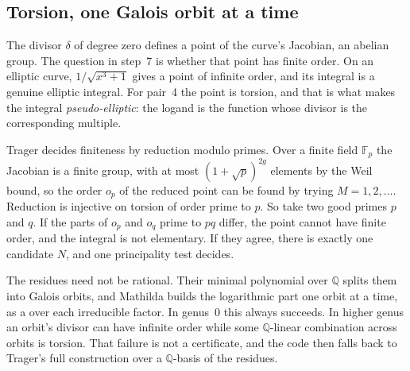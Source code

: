 \subsection{Torsion, one Galois orbit at a time}
\label{ssec:int-torsion}

The divisor \(\delta\) of degree zero defines a point of the curve's Jacobian, an
abelian group. The question in step~7 is whether that point has finite order. On
an elliptic curve, \(1/\sqrt{x^3+1}\) gives a point of infinite order, and its
integral is a genuine elliptic integral. For pair~4 the point is torsion, and that
is what makes the integral \emph{pseudo-elliptic}:
the logand is the function whose divisor is the corresponding multiple.

Trager decides finiteness by reduction modulo primes. Over a finite field
\(\mathbb{F}_p\) the Jacobian is a finite group, with at most \((1+\sqrt p)^{2g}\)
elements by the Weil bound, so the order \(o_p\) of the reduced point can be found
by trying \(M=1,2,\dots\). Reduction is injective on torsion of order prime to
\(p\). So take two good primes \(p\) and \(q\). If the parts of \(o_p\) and \(o_q\)
prime to \(pq\) differ, the point cannot have finite order, and the integral is
not elementary. If they agree, there is exactly one candidate \(N\), and one
principality test decides.

The residues need not be rational. Their minimal polynomial over \(\mathbb{Q}\)
splits them into Galois orbits, and Mathilda builds the logarithmic part one orbit
at a time, as a  over each irreducible factor. In genus~\(0\) this always
succeeds. In higher genus an orbit's divisor can have infinite order while some
\(\mathbb{Q}\)-linear combination across orbits is torsion. That failure is not a
certificate, and the code then falls back to Trager's full construction over a
\(\mathbb{Q}\)-basis of the residues.

